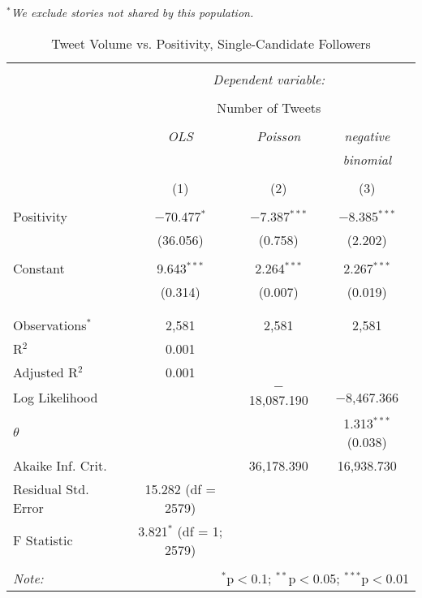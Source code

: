 \emph{$^{*}$We exclude stories not shared by this population.}  
\newpage 
\begin{table}[!htbp] \centering 
  \caption{Tweet Volume vs. Positivity, Single-Candidate Followers} 
  \label{} 
    \begin{tabular}{@{\extracolsep{5pt}}lccc} 
    \\[-1.8ex]\hline 
    \hline \\[-1.8ex] 
     & \multicolumn{3}{c}{\textit{Dependent variable:}} \\ 
    \cline{2-4} 
    \\[-1.8ex] & \multicolumn{3}{c}{Number of Tweets} \\ 
    \\[-1.8ex] & \textit{OLS} & \textit{Poisson} & \textit{negative} \\ 
     & \textit{} & \textit{} & \textit{binomial} \\ 
    \\[-1.8ex] & (1) & (2) & (3)\\ 
    \hline \\[-1.8ex] 
     Positivity & $-$70.477$^{*}$ & $-$7.387$^{***}$ & $-$8.385$^{***}$ \\ 
      & (36.056) & (0.758) & (2.202) \\ 
      & & & \\ 
     Constant & 9.643$^{***}$ & 2.264$^{***}$ & 2.267$^{***}$ \\ 
      & (0.314) & (0.007) & (0.019) \\ 
      & & & \\ 
    \hline \\[-1.8ex] 
    Observations$^{*}$ & 2,581 & 2,581 & 2,581 \\ 
    R$^{2}$ & 0.001 &  &  \\ 
    Adjusted R$^{2}$ & 0.001 &  &  \\ 
    Log Likelihood &  & $-$18,087.190 & $-$8,467.366 \\ 
    $\theta$ &  &  & 1.313$^{***}$  (0.038) \\ 
    Akaike Inf. Crit. &  & 36,178.390 & 16,938.730 \\ 
    Residual Std. Error & 15.282 (df = 2579) &  &  \\ 
    F Statistic & 3.821$^{*}$ (df = 1; 2579) &  &  \\ 
    \hline 
    \hline \\[-1.8ex] 
    \textit{Note:}  & \multicolumn{3}{r}{$^{*}$p$<$0.1; $^{**}$p$<$0.05; $^{***}$p$<$0.01} \\ 
    \end{tabular} 
\end{table}

